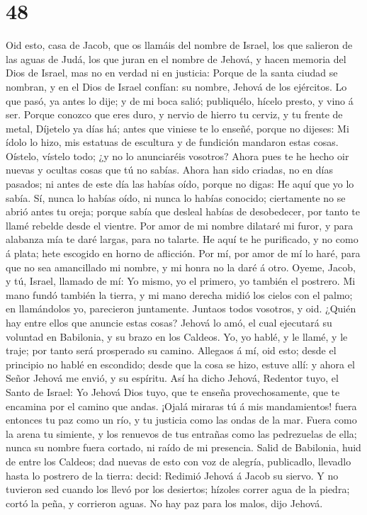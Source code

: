 \hypertarget{section-47}{%
\section{48}\label{section-47}}

 Oid esto, casa de Jacob, que os llamáis del nombre de
Israel, los que salieron de las aguas de Judá, los que juran en el
nombre de Jehová, y hacen memoria del Dios de Israel, mas no en verdad
ni en justicia:  Porque de la santa ciudad se nombran, y
en el Dios de Israel confían: su nombre, Jehová de los ejércitos.
 Lo que pasó, ya antes lo dije; y de mi boca salió;
publiquélo, hícelo presto, y vino á ser.  Porque conozco
que eres duro, y nervio de hierro tu cerviz, y tu frente de metal,
 Díjetelo ya días há; antes que viniese te lo enseñé,
porque no dijeses: Mi ídolo lo hizo, mis estatuas de escultura y de
fundición mandaron estas cosas.  Oístelo, vístelo todo; ¿y
no lo anunciaréis vosotros? Ahora pues te he hecho oir nuevas y ocultas
cosas que tú no sabías.  Ahora han sido criadas, no en
días pasados; ni antes de este día las habías oído, porque no digas: He
aquí que yo lo sabía.  Sí, nunca lo habías oído, ni nunca
lo habías conocido; ciertamente no se abrió antes tu oreja; porque sabía
que desleal habías de desobedecer, por tanto te llamé rebelde desde el
vientre.  Por amor de mi nombre dilataré mi furor, y para
alabanza mía te daré largas, para no talarte.  He aquí te
he purificado, y no como á plata; hete escogido en horno de aflicción.
 Por mí, por amor de mí lo haré, para que no sea
amancillado mi nombre, y mi honra no la daré á otro. 
Oyeme, Jacob, y tú, Israel, llamado de mí: Yo mismo, yo el primero, yo
también el postrero.  Mi mano fundó también la tierra, y
mi mano derecha midió los cielos con el palmo; en llamándolos yo,
parecieron juntamente.  Juntaos todos vosotros, y oid.
¿Quién hay entre ellos que anuncie estas cosas? Jehová lo amó, el cual
ejecutará su voluntad en Babilonia, y su brazo en los Caldeos.
 Yo, yo hablé, y le llamé, y le traje; por tanto será
prosperado su camino.  Allegaos á mí, oid esto; desde el
principio no hablé en escondido; desde que la cosa se hizo, estuve allí:
y ahora el Señor Jehová me envió, y su espíritu.  Así ha
dicho Jehová, Redentor tuyo, el Santo de Israel: Yo Jehová Dios tuyo,
que te enseña provechosamente, que te encamina por el camino que andas.
 ¡Ojalá miraras tú á mis mandamientos! fuera entonces tu
paz como un río, y tu justicia como las ondas de la mar. 
Fuera como la arena tu simiente, y los renuevos de tus entrañas como las
pedrezuelas de ella; nunca su nombre fuera cortado, ni raído de mi
presencia.  Salid de Babilonia, huid de entre los
Caldeos; dad nuevas de esto con voz de alegría, publicadlo, llevadlo
hasta lo postrero de la tierra: decid: Redimió Jehová á Jacob su siervo.
 Y no tuvieron sed cuando los llevó por los desiertos;
hízoles correr agua de la piedra; cortó la peña, y corrieron aguas.
 No hay paz para los malos, dijo Jehová.

